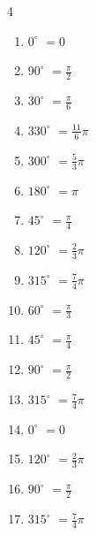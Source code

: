 \begin{multicols}{4}
\begin{enumerate}
\columnbreak %

  \item $\displaystyle 0^{\circ}$
        $\displaystyle =0$

  \item $\displaystyle 90^{\circ}$
        $\displaystyle =\frac{\pi}{2}$

  \item $\displaystyle 30^{\circ}$
        $\displaystyle =\frac{\pi}{6}$

  \item $\displaystyle 330^{\circ}$
        $\displaystyle =\frac{11}{6}\pi$

  \item $\displaystyle 300^{\circ}$
        $\displaystyle =\frac{5}{3}\pi$

  \item $\displaystyle 180^{\circ}$
        $\displaystyle =\pi$

  \item $\displaystyle 45^{\circ}$
        $\displaystyle =\frac{\pi}{4}$

  \item $\displaystyle 120^{\circ}$
        $\displaystyle =\frac{2}{3}\pi$

  \item $\displaystyle 315^{\circ}$
        $\displaystyle =\frac{7}{4}\pi$

  \item $\displaystyle 60^{\circ}$
        $\displaystyle =\frac{\pi}{3}$

  \item $\displaystyle 45^{\circ}$
        $\displaystyle =\frac{\pi}{4}$

  \item $\displaystyle 90^{\circ}$
        $\displaystyle =\frac{\pi}{2}$

  \item $\displaystyle 315^{\circ}$
        $\displaystyle =\frac{7}{4}\pi$

  \item $\displaystyle 0^{\circ}$
        $\displaystyle =0$

  \item $\displaystyle 120^{\circ}$
        $\displaystyle =\frac{2}{3}\pi$

  \item $\displaystyle 90^{\circ}$
        $\displaystyle =\frac{\pi}{2}$

  \item $\displaystyle 315^{\circ}$
        $\displaystyle =\frac{7}{4}\pi$


\end{enumerate}
\end{multicols}

